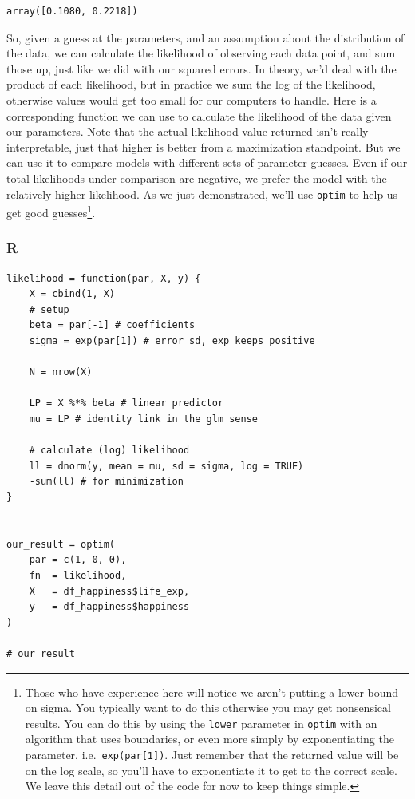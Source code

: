 \documentclass[
  letterpaper,
]{krantz}
\begin{document}
\begin{verbatim}
array([0.1080, 0.2218])
\end{verbatim}

So, given a guess at the parameters, and an assumption about the
distribution of the data, we can calculate the likelihood of observing
each data point, and sum those up, just like we did with our squared
errors. In theory, we'd deal with the product of each likelihood, but in
practice we sum the log of the likelihood, otherwise values would get
too small for our computers to handle. Here is a corresponding function
we can use to calculate the likelihood of the data given our parameters.
Note that the actual likelihood value returned isn't really
interpretable, just that higher is better from a maximization
standpoint. But we can use it to compare models with different sets of
parameter guesses. Even if our total likelihoods under comparison are
negative, we prefer the model with the relatively higher likelihood. As
we just demonstrated, we'll use \texttt{optim} to help us get good
guesses\footnote{Those who have experience here will notice we aren't
  putting a lower bound on sigma. You typically want to do this
  otherwise you may get nonsensical results. You can do this by using
  the \texttt{lower} parameter in \texttt{optim} with an algorithm that
  uses boundaries, or even more simply by exponentiating the parameter,
  i.e.~\texttt{exp(par{[}1{]})}. Just remember that the returned value
  will be on the log scale, so you'll have to exponentiate it to get to
  the correct scale. We leave this detail out of the code for now to
  keep things simple.}.

\subsubsection{R}

\begin{verbatim}
likelihood = function(par, X, y) {
    X = cbind(1, X)
    # setup
    beta = par[-1] # coefficients
    sigma = exp(par[1]) # error sd, exp keeps positive

    N = nrow(X)

    LP = X %*% beta # linear predictor
    mu = LP # identity link in the glm sense

    # calculate (log) likelihood
    ll = dnorm(y, mean = mu, sd = sigma, log = TRUE)
    -sum(ll) # for minimization
}


our_result = optim(
    par = c(1, 0, 0),
    fn  = likelihood,
    X   = df_happiness$life_exp,
    y   = df_happiness$happiness
)

# our_result
\end{verbatim}
\end{document}
